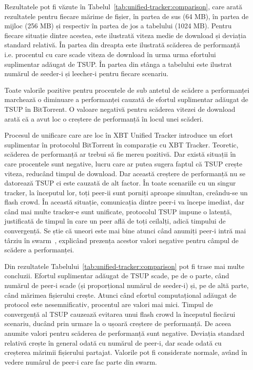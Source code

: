 Rezultatele pot fi văzute în Tabelul~\ref{tab:unified-tracker:comparison}, care arată rezultatele pentru fiecare mărime de fișier, în partea de sus (64 MB), în partea de mijloc (256 MB) și respectiv în partea de jos a tabelului (1024 MB). Pentru fiecare situație dintre acestea, este ilustrată viteza medie de download și deviația standard relativă. În partea din dreapta este ilustrată scăderea de performanță i.e. procentul cu care scade viteza de download în urma urma efortului suplimentar adăugat de TSUP. În partea din stânga a tabelului este ilustrat numărul de seeder-i și leecher-i pentru fiecare scenariu.

Toate valorile pozitive pentru procentele de sub antetul de scădere a performanței marchează o diminuare a performanței cauzată de efortul suplimentar adăugat de TSUP în BitTorrent. O valoare negativă pentru scăderea vitezei de download arată că a avut loc o creștere de performanță în locul unei scăderi.

Procesul de unificare care are loc în XBT Unified Tracker introduce un efort suplimentar în protocolul BitTorrent în comparație cu XBT Tracker. Teoretic, scăderea de performanță ar trebui să fie mereu pozitivă. Dar există situații în care procentele sunt negative, lucru care ar putea sugera faptul că TSUP crește viteza, reducând timpul de download. Dar această creștere de performanță nu se datorează TSUP ci este cauzată de alt factor. În toate scenariile cu un singur tracker, la începutul lor, toți peer-ii sunt porniți aproape simultan, creându-se un flash crowd.  În această situație, comunicația dintre peer-i va începe imediat, dar când mai multe tracker-e sunt unificate, protocolul TSUP impune o latență, justificată de timpul în care un peer află de toți ceilalți, adică timpului de convergență. Se știe că uneori este mai bine atunci când anumiți peer-i intră mai târziu în swarm~\cite{bt-analysis}, explicând prezența acestor valori negative pentru câmpul de scădere a performanței.



Din rezultatele Tabelului~\ref{tab:unified-tracker:comparison} pot fi trase mai multe concluzii. Efortul suplimentar adăugat de TSUP scade, pe de o parte, când numărul de peer-i scade (și proporțional numărul de seeder-i) și, pe de altă parte, când mărimea fișierului crește. Atunci când efortul computațional adăugat de protocol este nesemnificativ, procentul are valori mai mici. Timpul de convergență al TSUP cauzează evitarea unui flash crowd la începutul fiecărui scenariu, ducând prin urmare la o ușoară creștere de performanță. De aceea  anumite valori pentru scăderea de performanță sunt negative. Deviația standard relativă crește în general odată cu numărul de peer-i, dar scade odată cu creșterea mărimii fișierului partajat. Valorile pot fi considerate normale, având în vedere numârul de peer-i care fac parte din swarm.